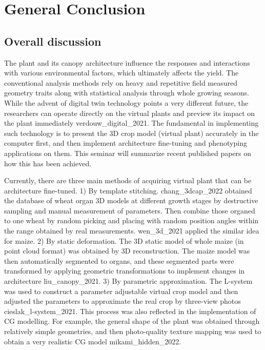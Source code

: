 \chapter{General Conclusion}

\section{Overall discussion}


The plant and its canopy architecture influence the responses and interactions with various environmental factors, which ultimately affects the yield. The conventional analysis methods rely on heavy and repetitive field measured geometry traits along with statistical analysis through whole growing seasons. While the advent of digital twin technology points a very different future, the researchers can operate directly on the virtual plants and preview its impact on the plant immediately verdouw_digital_2021. The fundamental in implementing such technology is to present the 3D crop model (virtual plant) accurately in the computer first, and then implement architecture fine-tuning and phenotyping applications on them. This seminar will summarize recent published papers on how this has been achieved.

Currently, there are three main methods of acquiring virtual plant that can be architecture fine-tuned. 1) By template stitching. chang_3dcap_2022 obtained the database of wheat organ 3D models at different growth stages by destructive sampling and manual measurement of parameters. Then combine those organed to one wheat by random picking and placing with random position angles within the range obtained by real measurements. wen_3d_2021 applied the similar idea for maize. 2) By static deformation. The 3D static model of whole maize (in point cloud format) was obtained by 3D reconstruction. The maize model was then automatically segmented to organs, and these segmented parts were transformed by applying geometric transformations to implement changes in architecture liu_canopy_2021. 3) By parametric approximation. The L-system was used to construct a parameter adjustable virtual crop model and then adjusted the parameters to approximate the real crop by three-view photos cieslak_l-system_2021. This process was also reflected in the implementation of CG modelling. For example, the general shape of the plant was obtained through relatively simple geometries, and then photo-quality texture mapping was used to obtain a very realistic CG model mikami_hidden_2022.

